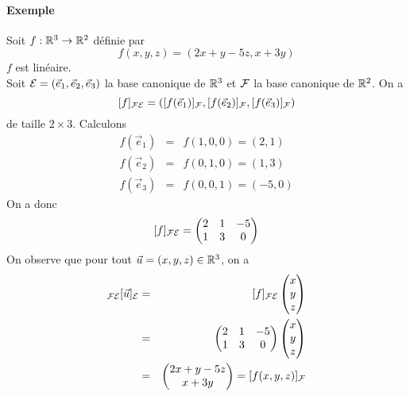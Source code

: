 \paragraph{Exemple} Soit $f: \mathbb{R}^3 \rightarrow \mathbb{R}^2$ définie par
$$f(x, y, z) = (2x + y - 5z ,  x + 3y)$$
$f$ est linéaire. \\
Soit $\mathcal{E} = (\vec{e}_1, \vec{e}_2, \vec{e}_3)$ la base canonique de $\mathbb{R}^3$ et $\mathcal{F}$ la base canonique de $\mathbb{R}^2$. On a
$$[f]_{\mathcal{F} \mathcal{E}} = ([f(\vec{e}_1)]_{\mathcal{F}}, [f(\vec{e}_2)]_{\mathcal{F}},[f(\vec{e}_3)]_{\mathcal{F}})$$ de taille $2 \times 3$. Calculons
\begin{eqnarray*}
  f(\vec{e}_1) &=& f(1, 0, 0) = (2, 1) \\
  f(\vec{e}_2) &=& f(0, 1, 0) = (1, 3) \\
  f(\vec{e}_3) &=& f(0, 0, 1) = (-5, 0) 
\end{eqnarray*}
On a donc
$$[f]_{\mathcal{F} \mathcal{E}}
  =
  \begin{pmatrix}
    2 & 1 & -5 \\
    1 & 3 & 0
  \end{pmatrix}$$
On observe que pour tout $\vec{u} = (x, y, z) \in \mathbb{R}^3$, on a
\begin{eqnarray*}
  [f]_{\cF \cE}[\vec{u}]_\cE 
  &=& [f]_{\cF \cE} \begin{pmatrix} x \\ y \\ z \end{pmatrix} \\
  &=&
    \begin{pmatrix}
      2 & 1 & -5 \\
      1 & 3 & 0
    \end{pmatrix}
    \begin{pmatrix} x \\ y \\ z \end{pmatrix} \\
  &=&
    \begin{pmatrix} 
      2x + y -5 z \\ 
      x + 3y
    \end{pmatrix}
  = [f(x, y, z)]_{\cF}
\end{eqnarray*}

